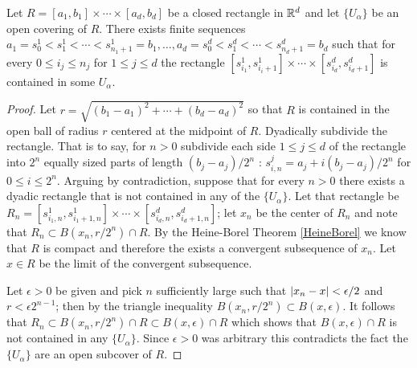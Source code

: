 \begin{lem}\label{banach:PrimitiveFollowingMappingSubdivision}Let $R= [a_1, b_1] \times \cdots \times [a_d, b_d]$ be a closed rectangle in $\mathbb{R}^d$ and let $\lbrace U_\alpha \rbrace$ be an open covering of $R$.    There exists finite sequences $a_1 = s^1_0 < s^1_1 < \cdots < s^1_{n_1 + 1} = b_1, \dots, a_d = s^d_0 < s^d_1 < \cdots < s^d_{n_d + 1} = b_d$ such that for every $0 \leq i_j \leq n_j$ for $1\leq j \leq d$ the rectangle $[s^1_{i_1}, s^1_{i_i+1}] \times \cdots \times [s^d_{i_d}, s^d_{i_d+1}]$ is contained in some $U_\alpha$.   
\end{lem}
\begin{proof}
  Let $r = \sqrt{(b_1 - a_1)^2 + \cdots + (b_d-a_d)^2}$ so that $R$ is contained in the open ball of radius $r$ centered at the midpoint of $R$.   Dyadically subdivide the rectangle.   That is to say, for $n > 0$ subdivide each side $1 \leq j \leq d$ of the rectangle into $2^n$ equally sized parts of length $(b_j-a_j)/2^n$ : $s^j_{i,n} = a_j + i(b_j-a_j)/2^n$ for $0 \leq i \leq 2^n$.   Arguing by contradiction, suppose that for every $n > 0$ there exists a dyadic rectangle that is not contained in any of the $\lbrace U_\alpha \rbrace$.   Let that rectangle be $R_n = [s^1_{i_1,n}, s^1_{i_1+1,n}] \times \cdots \times [s^d_{i_d,n}, s^d_{i_d+1,n}]$; let $x_n$ be the center of $R_n$ and note that $R_n \subset B(x_n, r/2^n) \cap R$.   By the Heine-Borel Theorem \ref{HeineBorel} we know that $R$ is compact and therefore the exists a convergent subsequence of $x_n$.   Let $x \in R$ be the limit of the convergent subsequence.

  Let $\epsilon>0$ be given and pick $n$ sufficiently large such that $\left \vert x_n - x \right \vert < \epsilon/2$ and $r < \epsilon 2^{n-1}$; then by the triangle inequality $B(x_n, r/2^n) \subset  B(x, \epsilon)$.   It follows that $R_n \subset B(x_n, r/2^n) \cap R \subset B(x, \epsilon) \cap R$ which shows that $B(x, \epsilon) \cap R$ is not contained in any $\lbrace U_\alpha \rbrace$.   Since $\epsilon>0$ was arbitrary this contradicts the fact the  $\lbrace U_\alpha \rbrace$ are an open subcover of $R$.
\end{proof}

